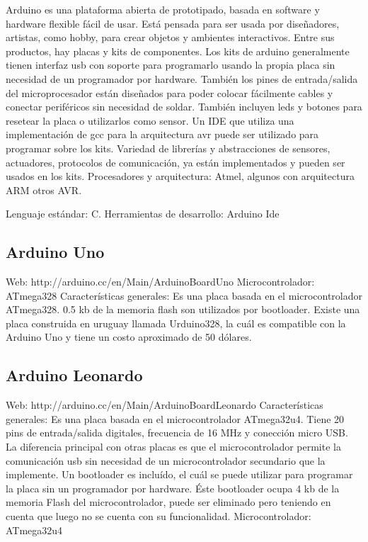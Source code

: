 
Arduino es una plataforma abierta de prototipado, basada en software y hardware flexible fácil de usar. Está pensada para ser usada por diseñadores, artistas, como hobby, para crear objetos y ambientes interactivos. Entre sus productos, hay placas y kits de componentes.
Los kits de arduino generalmente tienen interfaz usb con soporte para programarlo usando la propia placa sin necesidad de un programador por hardware. También los pines de entrada/salida del microprocesador están diseñados para poder colocar fácilmente cables y conectar periféricos sin necesidad de soldar.
También incluyen leds y botones para resetear la placa o utilizarlos como sensor.
Un IDE que utiliza una implementación de gcc para la arquitectura
avr puede ser utilizado para programar sobre los kits.
Variedad de librerías y abstracciones de sensores, actuadores,
protocolos de comunicación, ya están implementados y pueden ser usados en los kits.
Procesadores y arquitectura: Atmel, algunos con arquitectura ARM otros AVR.

Lenguaje estándar: C.
Herramientas de desarrollo: Arduino Ide

\subsection{Arduino Uno}
Web: http://arduino.cc/en/Main/ArduinoBoardUno
Microcontrolador: ATmega328
Características generales:
Es una placa basada en el microcontrolador ATmega328.
0.5 kb de la memoria flash son utilizados por bootloader.
Existe una placa construida en uruguay llamada Urduino328,
la cuál es compatible con la Arduino Uno y tiene un costo aproximado de 50 dólares.

\subsection{Arduino Leonardo}
Web:
http://arduino.cc/en/Main/ArduinoBoardLeonardo
Características generales:
Es una placa basada en el microcontrolador ATmega32u4. Tiene 20 pins de entrada/salida digitales, frecuencia de 16 MHz y conección micro USB.
La diferencia principal con otras placas es que el microcontrolador permite la comunicación usb sin necesidad de un microcontrolador secundario que la implemente.
Un bootloader es incluído, el cuál se puede utilizar para programar la placa sin un programador por hardware. Éste bootloader ocupa 4 kb de la memoria Flash del microcontrolador, puede ser eliminado pero teniendo en cuenta que luego no se cuenta con su funcionalidad.
Microcontrolador:
ATmega32u4

